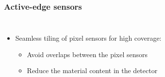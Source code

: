 \begin{frame}
  \frametitle{Active-edge sensors}

  \begin{columns}

    \begin{itemize}
    \item Seamless tiling of pixel sensors for high coverage:
      \begin{itemize}
      \item Avoid overlaps between the pixel sensors
      \item Reduce the material content in the detector
      \end{itemize}
    \end{itemize}

    \vspace{-0.8cm}
\end{columns}
\end{frame}
